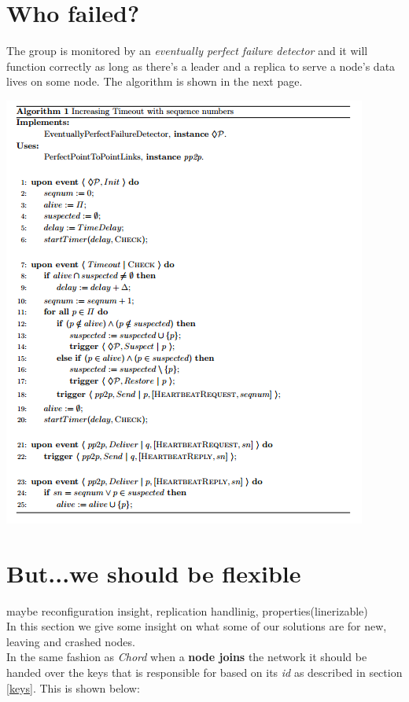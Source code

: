 \documentclass[a4paper, 11pt]{article}
\begin{document}
\section{Who failed?}

\noindent The group is monitored by an \textit{eventually perfect failure detector} and it will function correctly as long as there's a leader and a replica to serve a node's data lives on some node. The algorithm is shown in the next page.

{\centering\includegraphics[scale = 1]{./figures/epfd-algorithm.png}\par}

\clearpage

\section{But...we should be flexible}

\noindent maybe reconfiguration insight, replication handlinig, properties(linerizable) \\

\noindent In this section we give some insight on what some of our solutions are for new, leaving and crashed nodes. \\
\noindent In the same fashion as \textit{Chord} when a \textbf{node joins} the network it should be handed over the keys that is responsible for based on its \textit{id} as described in section \ref{keys}. This is shown below:
\end{document}
